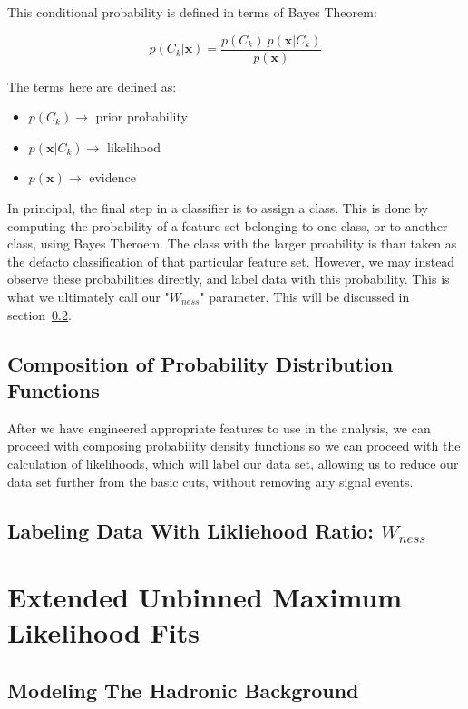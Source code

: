 This conditional probability is defined in terms of Bayes Theorem:

\begin{equation}
	\label{eq:bayes_theorm}
p(C_k \vert \mathbf{x}) = \frac{p(C_k) \ p(\mathbf{x} \vert C_k)}{p(\mathbf{x})}
\end{equation}

The terms here are defined as:
\begin{itemize}
	\item $p(C_k)\rightarrow$ prior probability
	\item $p(\mathbf{x} \vert C_k)\rightarrow$ likelihood
	\item $p(\mathbf{x})\rightarrow$ evidence
\end{itemize}

In principal, the final step in a classifier is to assign a class. This is done
by computing the probability of a feature-set belonging to one class, or to
another class, using Bayes Theroem. The class with the larger proability is than
taken as the defacto classification of that particular feature set. However, we
may instead observe these probabilities directly, and label data with this
probability. This is what we ultimately call our "$W_{ness}$" parameter. This
will be discussed in section~\ref{sec:likelihood}.

\subsection{Composition of Probability Distribution Functions}
After we have engineered appropriate features to use in the analysis, we can
proceed with composing probability density functions so we can proceed with the
calculation of likelihoods, which will label our data set, allowing us to reduce
our data set further from the basic cuts, without removing any signal events.


\subsection{Labeling Data With Likliehood Ratio: $W_{ness}$}
\label{sec:likelihood}
\section{Extended Unbinned Maximum Likelihood Fits}
\subsection{Modeling The Hadronic Background}
